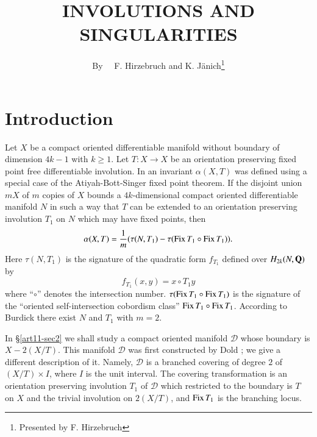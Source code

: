 \title{INVOLUTIONS AND SINGULARITIES}

\author{By~~ F. Hirzebruch and K. J\"anich\footnote{Presented by F. Hirzebruch}}

\date{}

\maketitle

\setcounter{pageoriginal}{218}
\section{Introduction}\label{art11-sec1}\pageoriginale

Let $X$ be a compact oriented differentiable manifold without boundary of dimension $4k-1$ with $k\geq 1$. Let $T:X\to X$ be an orientation preserving fixed point free differentiable involution. In \cite{art11-key7} an invariant $\alpha(X,T)$ was defined using a special case of the Atiyah-Bott-Singer fixed point theorem. If the disjoint union $mX$ of $m$ copies of $X$ bounds a $4k$-dimensional compact oriented differentiable manifold $N$ in such a way that $T$ can be extended to an orientation preserving involution $T_{1}$ on $N$ which may have fixed points, then
\begin{equation}
\alpha(X,T)=\dfrac{1}{m}(\tau(N,T_{1})- \tau(\operatorname{\mathrm{Fix}} T_{1}\circ \operatorname{\mathrm{Fix}} T_{1})).\label{art11-sec1-eq1}
\end{equation}
Here $\tau(N,T_{1})$ is the signature of the quadratic form $f_{T_{1}}$ defined over $H_{2k}(N,\mathbf{Q})$ by
$$
f_{T_{1}}(x,y)=x\circ T_{1}y
$$
where ``$\circ$'' denotes the intersection number. $\tau(\operatorname{\mathrm{Fix}} T_{1}\circ \operatorname{\mathrm{Fix}} T_{1})$ is the signature of the ``oriented self-intersection cobordism class'' $\operatorname{\mathrm{Fix}} T_{1}\circ \operatorname{\mathrm{Fix}} T_{1}$. According to Burdick \cite{art11-key4} there exist $N$ and $T_{1}$ with $m=2$.

In \S\ref{art11-sec2} we shall study a compact oriented manifold $\mathscr{D}$ whose boundary is $X-2(X/T)$. This manifold $\mathscr{D}$ was first constructed by Dold \cite{art11-key5}; we give a different description of it. Namely, $\mathscr{D}$ is a branched covering of degree $2$ of $(X/T)\times I$, where $I$ is the unit interval. The covering transformation is an orientation preserving involution $T_{1}$ of $\mathscr{D}$ which restricted to the boundary is $T$ on $X$ and the trivial involution on $2(X/T)$, and $\operatorname{\mathrm{Fix}} T_{1}$ is the branching locus.

